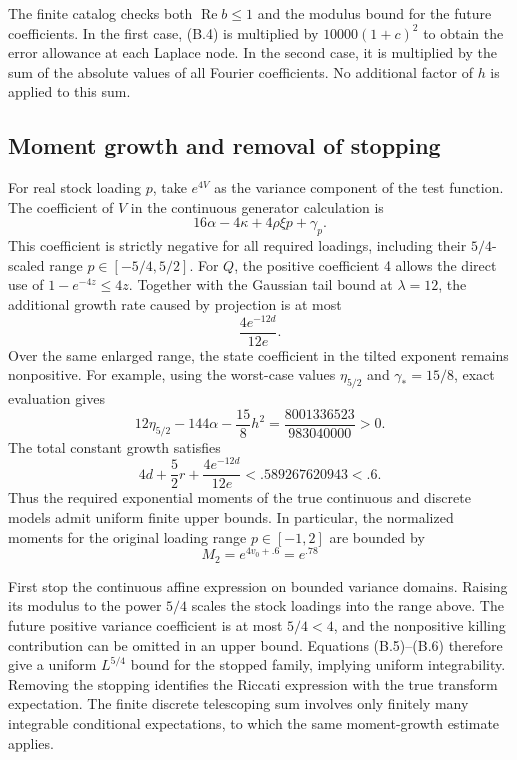 The finite catalog checks both \(\operatorname{Re}b\le1\) and the modulus bound for the future coefficients. In the first case, (B.4) is multiplied by \(10000(1+c)^2\) to obtain the error allowance at each Laplace node. In the second case, it is multiplied by the sum of the absolute values of all Fourier coefficients. No additional factor of \(h\) is applied to this sum.

\subsection{Moment growth and removal of stopping}

For real stock loading \(p\), take \(e^{4V}\) as the variance component of the test function. The coefficient of \(V\) in the continuous generator calculation is
\[
16\alpha-4\kappa+4\rho\xi p+\gamma_p.
\tag{B.5}
\]
This coefficient is strictly negative for all required loadings, including their \(5/4\)-scaled range \(p\in[-5/4,5/2]\). For \(Q\), the positive coefficient 4 allows the direct use of \(1-e^{-4z}\le4z\). Together with the Gaussian tail bound at \(\lambda=12\), the additional growth rate caused by projection is at most
\[
\frac{4e^{-12d}}{12e}.
\]
Over the same enlarged range, the state coefficient in the tilted exponent remains nonpositive. For example, using the worst-case values \(\eta_{5/2}\) and \(\gamma_*=15/8\), exact evaluation gives
\[
12\eta_{5/2}-144\alpha-\frac{15}{8}h^2
=\frac{8001336523}{983040000}>0.
\]
The total constant growth satisfies
\[
4d+\frac52r+\frac{4e^{-12d}}{12e}
<.589267620943<.6.
\tag{B.6}
\]
Thus the required exponential moments of the true continuous and discrete models admit uniform finite upper bounds. In particular, the normalized moments for the original loading range \(p\in[-1,2]\) are bounded by
\[
M_2=e^{4v_0+.6}=e^{.78}
\tag{B.7}
\]

First stop the continuous affine expression on bounded variance domains. Raising its modulus to the power \(5/4\) scales the stock loadings into the range above. The future positive variance coefficient is at most \(5/4<4\), and the nonpositive killing contribution can be omitted in an upper bound. Equations (B.5)--(B.6) therefore give a uniform \(L^{5/4}\) bound for the stopped family, implying uniform integrability. Removing the stopping identifies the Riccati expression with the true transform expectation. The finite discrete telescoping sum involves only finitely many integrable conditional expectations, to which the same moment-growth estimate applies.

